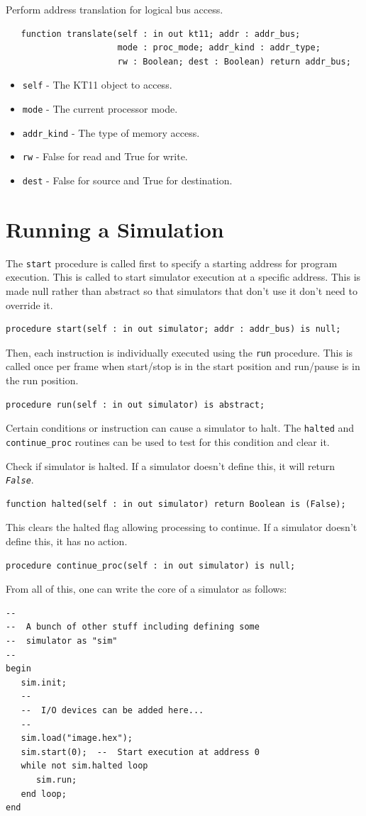\documentclass[10pt, openany]{book}
\newcommand{\function}[1]{\texttt{#1}}
\newcommand{\constant}[1]{\emph{\texttt{#1}}}
\newcommand{\keyword}[1]{\texttt{#1}}
\begin{document}
Perform address translation for logical bus access.
\begin{lstlisting}
   function translate(self : in out kt11; addr : addr_bus;
                      mode : proc_mode; addr_kind : addr_type;
                      rw : Boolean; dest : Boolean) return addr_bus;
\end{lstlisting}
\begin{itemize}
  \item \keyword{self} - The KT11 object to access.
  \item \keyword{mode} - The current processor mode.
  \item \keyword{addr\_kind} - The type of memory access.
  \item \keyword{rw} - False for read and True for write.
  \item \keyword{dest} - False for source and True for destination.
\end{itemize}

\chapter{Running a Simulation}
The \function{start} procedure is called first to specify a starting address for program execution.  This is called to start simulator execution at a specific address.  This is made null rather than abstract so that simulators that don't use it don't need to override it.
\begin{lstlisting}
procedure start(self : in out simulator; addr : addr_bus) is null;
\end{lstlisting}
Then, each instruction is individually executed using the \function{run} procedure.  This is called once per frame when start/stop is in the start position and run/pause is in the run position.
\begin{lstlisting}
procedure run(self : in out simulator) is abstract;
\end{lstlisting}
Certain conditions or instruction can cause a simulator to halt.
The \function{halted} and \function{continue\_proc} routines can be used to test for this condition and clear it.

Check if simulator is halted.  If a simulator doesn't define this, it will return \constant{False}.
\begin{lstlisting}
function halted(self : in out simulator) return Boolean is (False);
\end{lstlisting}
This clears the halted flag allowing processing to continue.  If a simulator doesn't define this, it has no action.
\begin{lstlisting}
procedure continue_proc(self : in out simulator) is null;
\end{lstlisting}
From all of this, one can write the core of a simulator as follows:
\begin{lstlisting}
--
--  A bunch of other stuff including defining some
--  simulator as "sim"
--
begin
   sim.init;
   --
   --  I/O devices can be added here...
   --
   sim.load("image.hex");
   sim.start(0);  --  Start execution at address 0
   while not sim.halted loop
      sim.run;
   end loop;
end
\end{lstlisting}

\clearpage
{}
\nocite{dec84}


\end{document}
